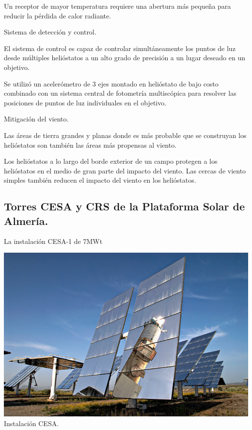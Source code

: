 \documentclass[12pt]{article}
\begin{document}
Un receptor de mayor temperatura requiere una abertura más pequeña para reducir la pérdida de calor radiante.

Sistema de detección y control.

El sistema de control es capaz de controlar simultáneamente los puntos de luz desde múltiples helióstatos a un alto grado de precisión a un lugar deseado en un objetivo.

Se utilizó un acelerómetro de 3 ejes montado en helióstato de bajo costo combinado con un sistema central de fotometría multiscópica para resolver las posiciones de puntos de luz individuales en el objetivo.

Mitigación del viento.

Las áreas de tierra grandes y planas donde es más probable que se construyan los helióstatos son también las áreas más propensas al viento.

Los helióstatos a lo largo del borde exterior de un campo protegen a los helióstatos en el medio de gran parte del impacto del viento. Las cercas de viento simples también reducen el impacto del viento en los helióstatos. \cite{GoogleWebSite}



\subsection{Torres CESA y CRS de la Plataforma Solar de Almería.}

La instalación CESA-1 de 7MWt

\includegraphics[width=\textwidth]{unnamed (4).png}
Instalación CESA. \cite{PSA1WebSite}
\end{document}
